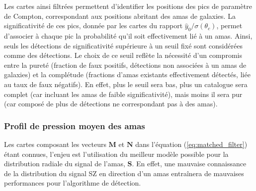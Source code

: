 Les cartes ainsi filtrées permettent d'identifier les positions des pics de paramètre de Compton, correspondant aux positions abritant des amas de galaxies.
La significativité de ces pics, donnée par les cartes du rapport $\hat{y}_0 / \sigma(\theta_c)$, permet d'associer à chaque pic la probabilité qu'il soit effectivement lié à un amas.
Ainsi, seuls les détections de significativité supérieure à un seuil fixé sont considérées comme des détections.
Le choix de ce seuil reflète la nécessité d'un compromis entre la pureté (fraction de faux positifs, détections non associées à un amas de galaxies) et la complétude (fractions d'amas existants effectivement détectés, liée au taux de faux négatifs).
En effet, plus le seuil sera bas, plus un catalogue sera complet (car incluant les amas de faible significativité), mais moins il sera pur (car composé de plus de détections ne correspondant pas à des amas).

\subsubsection{Profil de pression moyen des amas} %
\label{sec:univ_press_prof}
Les cartes composant les vecteurs $\mathbf{M}$ et $\mathbf{N}$ dans l'équation (\ref{eq:matched_filter}) étant connues\footnotemark, l'enjeu est l'utilisation du meilleur modèle possible pour la distribution radiale du signal de l'amas, $\mathbf{S}$.
En effet, une mauvaise connaissance de la distribution du signal SZ en direction d'un amas entraînera de mauvaises performances pour l'algorithme de détection.

